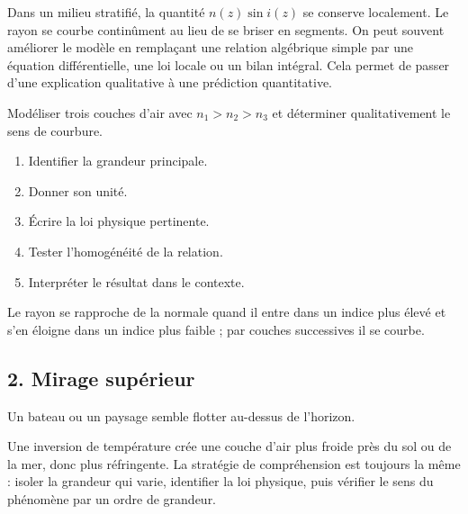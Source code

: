 \documentclass[11pt,a4paper]{article}
\begin{document}
\begin{approfondissementbox}
Dans un milieu stratifié, la quantité $n(z)\sin i(z)$ se conserve localement. Le rayon se courbe continûment au lieu de se briser en segments.
On peut souvent améliorer le modèle en remplaçant une relation algébrique simple par une équation différentielle, une loi locale ou un bilan intégral. Cela permet de passer d'une explication qualitative à une prédiction quantitative.
\end{approfondissementbox}

\begin{exercicebox}
Modéliser trois couches d'air avec $n_1>n_2>n_3$ et déterminer qualitativement le sens de courbure.
\begin{enumerate}
  \item Identifier la grandeur principale.
  \item Donner son unité.
  \item Écrire la loi physique pertinente.
  \item Tester l'homogénéité de la relation.
  \item Interpréter le résultat dans le contexte.
\end{enumerate}
\end{exercicebox}

\begin{corrigebox}[Indication]
Le rayon se rapproche de la normale quand il entre dans un indice plus élevé et s'en éloigne dans un indice plus faible ; par couches successives il se courbe.
\end{corrigebox}


\subsection{2. Mirage supérieur}

\begin{exemplebox}
Un bateau ou un paysage semble flotter au-dessus de l'horizon.
\end{exemplebox}

\begin{methodebox}
Une inversion de température crée une couche d'air plus froide près du sol ou de la mer, donc plus réfringente.
La stratégie de compréhension est toujours la même : isoler la grandeur qui varie, identifier la loi physique, puis vérifier le sens du phénomène par un ordre de grandeur.
\end{methodebox}
\end{document}
